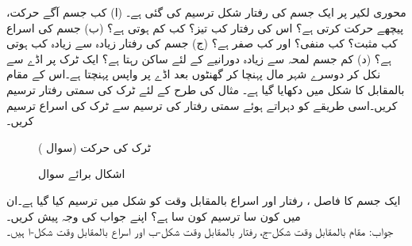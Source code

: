 محوری لکیر پر ایک جسم کی رفتار  شکل  ترسیم کی گئی ہے۔ (ا) کب جسم آگے حرکت، پیچھے حرکت کرتی ہے؟ اس کی رفتار کب تیز؟ کب کم ہوتی ہے؟ (ب) جسم کی اسراع کب مثبت؟ کب منفی؟ اور کب صفر ہے؟ (ج) جسم کی رفتار زیادہ سے زیادہ کب ہوتی ہے؟ (د) کم جسم لمحہ سے زیادہ دورانیے کے لئے ساکن رہتا ہے؟
ایک ٹرک  پر اڈے سے نکل کر دوسرے شہر مال پہنچا کر  گھنٹوں بعد اڈے پر واپس پہنچتا ہے۔اس  کے مقام بالمقابل کا شکل  میں دکھایا گیا ہے۔  مثال  کی طرح  کے لئے  ٹرک کی سمتی رفتار  ترسیم کریں۔اسی طریقے کو دہراتے ہوئے سمتی رفتار کی ترسیم سے ٹرک کی اسراع  ترسیم کریں۔ 

\begin{figure}
\centering
\begin{minipage}{0.45\textwidth}
\centering
{}
\caption{ٹرک کی حرکت (سوال )}
\label{شکل_سوال_تفرق_ٹرک}
\end{minipage}\hfill
\begin{minipage}{0.45\textwidth}
\centering
{}
\caption{اشکال برائے سوال }
\label{شکل_سوال_تفرق_فاصلہ_رفتار_اسراع}
\end{minipage}%
\end{figure}
ایک جسم کا فاصل ، رفتار  اور اسراع  بالمقابل وقت  کو شکل  میں ترسیم کیا گیا ہے۔ان میں کون سا ترسیم کون سا ہے؟ اپنے جواب کی وجہ پیش کریں۔\\
جواب:\quad
مقام بالمقابل وقت شکل-ج، رفتار بالمقابل وقت شکل-ب اور اسراع بالمقابل وقت شکل-ا ہیں۔


